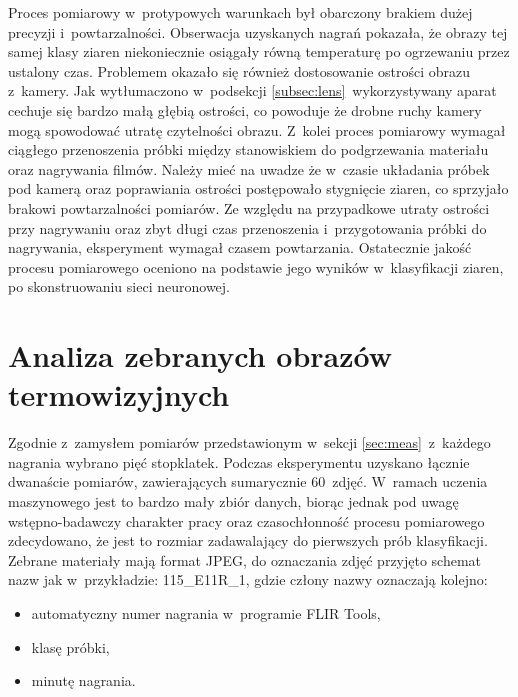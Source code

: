 Proces pomiarowy w~protypowych warunkach był obarczony brakiem dużej precyzji
i~powtarzalności.
Obserwacja uzyskanych nagrań pokazała, że obrazy tej samej klasy ziaren
niekoniecznie osiągały równą temperaturę po ogrzewaniu przez ustalony czas.
Problemem okazało się również dostosowanie ostrości obrazu z~kamery.
Jak wytłumaczono w~podsekcji \ref{subsec:lens}~wykorzystywany aparat cechuje
się bardzo małą głębią ostrości, co powoduje że drobne ruchy kamery
mogą spowodować utratę czytelności obrazu.
Z~kolei proces pomiarowy wymagał ciągłego przenoszenia próbki między
stanowiskiem do podgrzewania materiału oraz nagrywania filmów.
Należy mieć na uwadze że w~czasie układania próbek pod kamerą oraz poprawiania
ostrości postępowało stygnięcie ziaren, co sprzyjało brakowi powtarzalności
pomiarów.
Ze względu na przypadkowe utraty ostrości przy nagrywaniu oraz zbyt długi czas
przenoszenia i~przygotowania próbki do nagrywania, eksperyment wymagał czasem
powtarzania.
Ostatecznie jakość procesu pomiarowego oceniono na podstawie jego wyników
w~klasyfikacji ziaren, po skonstruowaniu sieci neuronowej.

\section{Analiza zebranych obrazów termowizyjnych}
Zgodnie z~zamysłem pomiarów przedstawionym w~sekcji \ref{sec:meas}~z~każdego
nagrania wybrano pięć stopklatek.
Podczas eksperymentu uzyskano łącznie dwanaście pomiarów, zawierających
sumarycznie 60~zdjęć.
W~ramach uczenia maszynowego jest to bardzo mały zbiór danych, biorąc jednak
pod uwagę wstępno-badawczy charakter pracy oraz czasochłonność procesu 
pomiarowego zdecydowano, że jest to rozmiar zadawalający do pierwszych
prób klasyfikacji.
Zebrane materiały mają format JPEG, do oznaczania zdjęć przyjęto schemat
nazw jak w~przykładzie: 115\_E11R\_1, gdzie człony nazwy oznaczają kolejno:
\begin{itemize}
	\item automatyczny numer nagrania w~programie FLIR Tools,
	\item klasę próbki,
	\item minutę nagrania.
\end{itemize}

